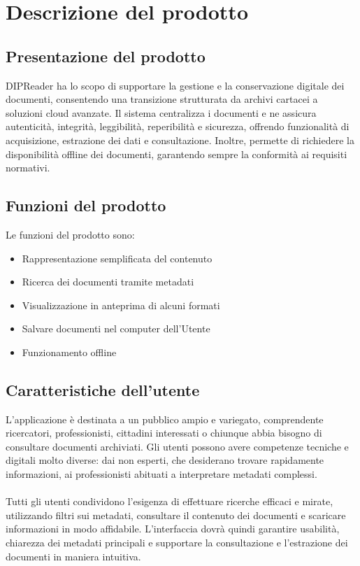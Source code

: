 \documentclass[a4paper,12pt]{article}
\begin{document}
    \section{Descrizione del prodotto} {
        \subsection{Presentazione del prodotto} {
            DIPReader ha lo scopo di supportare la gestione e la conservazione digitale dei documenti, consentendo una transizione strutturata da archivi cartacei a soluzioni cloud avanzate. Il sistema centralizza i documenti e ne assicura autenticità, integrità, leggibilità, reperibilità e sicurezza, offrendo funzionalità di acquisizione, estrazione dei dati e consultazione. Inoltre, permette di richiedere la disponibilità offline dei documenti, garantendo sempre la conformità ai requisiti normativi. 
        }
        \subsection{Funzioni del prodotto} {
            Le funzioni del prodotto sono: 
            \begin{itemize}
                \item Rappresentazione semplificata del contenuto 
                \item Ricerca dei documenti tramite metadati
                \item Visualizzazione in anteprima di alcuni formati
                \item Salvare documenti nel computer dell'Utente
                \item Funzionamento offline
            \end{itemize}
        }
        \subsection{Caratteristiche dell'utente} {
            L’applicazione è destinata a un pubblico ampio e variegato, comprendente ricercatori, professionisti, cittadini interessati o chiunque abbia bisogno di consultare documenti archiviati. Gli utenti possono avere competenze tecniche e digitali molto diverse: dai non esperti, che desiderano trovare rapidamente informazioni, ai professionisti abituati a interpretare metadati complessi. \\
            \\
            Tutti gli utenti condividono l’esigenza di effettuare ricerche efficaci e mirate, utilizzando filtri sui metadati, consultare il contenuto dei documenti e scaricare informazioni in modo affidabile. L’interfaccia dovrà quindi garantire usabilità, chiarezza dei metadati principali e supportare la consultazione e l’estrazione dei documenti in maniera intuitiva.
        }

    }
    \newpage
\end{document}
